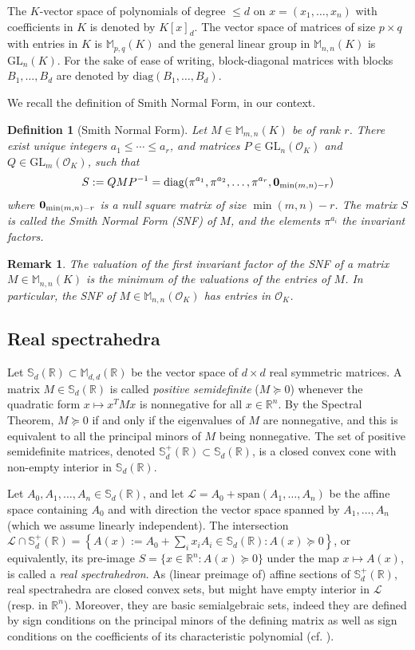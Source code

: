 \documentclass[a4paper,12pt]{article}
\newtheorem{definition}{Definition}
\newtheorem{remark}{Remark}
\newcommand{\R}{\mathbb{R}} %
\newcommand{\allmat}{\mathbb{M}} %
\newcommand{\sym}{\mathbb{S}} %
\renewcommand{\span}[1]{{\text{span}(#1)}} %
\newcommand{\calL}{\mathcal{L}} %
\newcommand{\OK}{\mathcal{O}_K}
\def\diag{\mathrm{diag}}
\newcommand{\GL}{\mathrm{GL}}
\begin{document}
The $K$-vector space of polynomials of degree $\leq d$ on $x=(x_1,\ldots,x_n)$
with coefficients in $K$ is denoted by $K[x]_{d}$. The vector space of matrices of
size $p \times q$ with entries in $K$ is $\allmat_{p,q}(K)$ and the general
linear group in $\allmat_{n,n}(K)$ is $\GL_n(K)$.
For the sake
of ease of writing, block-diagonal matrices with blocks $B_1,\ldots,B_d$ are denoted by
$\diag(B_1, \ldots, B_d)$.

We recall the definition of Smith Normal Form, in our context.
\begin{definition}[Smith Normal Form]\label{smith_nf}
  Let $M \in \allmat_{m,n}(K)$ be of rank $r$. There exist unique integers $a_1 \leq \cdots \leq a_r$, and
  matrices $P \in \GL_n(\OK)$ and $Q \in \GL_m(\OK)$, such that
  $$
  S := QMP^{-1} = \diag(\pi^{a_1}, \pi^{a_2}, \ldots, \pi^{a_r}, {\bf 0}_{\min(m,n)-r})
  $$
  where ${\bf 0}_{\min(m,n)-r}$ is a null square matrix of size $\min(m,n)-r$.
  The matrix $S$ is called the \emph{Smith Normal Form (SNF)} of $M$, and the elements $\pi^{a_i}$ the
  \emph{invariant factors}.
\end{definition}
\begin{remark}
  The valuation of the first invariant factor of the SNF of a matrix
  $M \in \allmat_{n,n}(K)$ is the minimum of the valuations of the entries of
  $M$. In particular, the SNF of $M \in \allmat_{n,n}(\OK)$ has entries in $\OK$.
\end{remark}


\subsection{Real spectrahedra}

Let $\sym_d(\R) \subset \allmat_{d,d}(\R)$ be the vector space of $d \times d$ real symmetric
matrices. A matrix $M \in \sym_d(\R)$
is called \emph{positive semidefinite} ($M \succeq 0$) whenever the quadratic
form $x \mapsto x^TMx$ is nonnegative for all $x\in \R^n$. By the Spectral Theorem, $M \succeq 0$
if and only if the eigenvalues of $M$ are nonnegative, and this is equivalent to all the principal minors
of $M$ being nonnegative. The set of positive semidefinite matrices, denoted $\sym_d^+(\R) \subset \sym_d(\R)$,
is a closed convex cone with non-empty interior in $\sym_d(\R)$.

Let $A_0,A_1,\ldots,A_n \in \sym_d(\R)$, and let $\calL = A_0+\span{A_1,\ldots,A_n}$ be the affine space
containing $A_0$ and with direction the vector space spanned by $A_1,\ldots,A_n$ (which we assume linearly
independent). The intersection $\calL \cap \sym_d^+(\R) = \left\{A(x) := A_0+\sum_i x_i A_i \in \sym_d(\R) :
A(x) \succeq 0\right\}$, or
equivalently, its pre-image $S = \{x \in \R^n : A(x) \succeq 0\}$ under the map $x \mapsto A(x)$, is called
a \emph{real spectrahedron}. As (linear preimage of) affine sections of $\sym_d^+(\R)$, real spectrahedra
are closed convex sets, but might have empty interior in $\calL$ (resp. in $\R^n$).
Moreover, they are basic semialgebraic sets, indeed they are defined by sign conditions on the principal
minors of the defining matrix as well as sign conditions on the coefficients of its characteristic polynomial
(cf. ).
\end{document}
